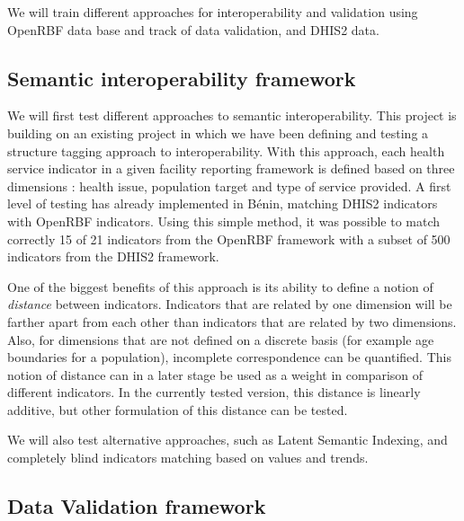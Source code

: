 We will train different approaches for interoperability and validation using OpenRBF data base and track of data validation, and DHIS2 data.

\subsection{Semantic interoperability framework}

We will first test different approaches to semantic interoperability. This project is building on an existing project in which we have been defining and testing a structure tagging approach to interoperability. With this approach, each health service indicator in a given facility reporting framework is defined based on three dimensions : health issue, population target and type of service provided. A first level of testing has already implemented in Bénin, matching DHIS2 indicators with OpenRBF indicators. Using this simple method, it was possible to match correctly 15 of 21 indicators from the OpenRBF framework with a subset of 500 indicators from the DHIS2 framework.

One of the biggest benefits of this approach is its ability to define a notion of \textit{distance} between indicators. Indicators that are related by one dimension will be farther apart from each other than indicators that are related by two dimensions. Also, for dimensions that are not defined on a discrete basis (for example age boundaries for a population), incomplete correspondence can be quantified. This notion of distance can in a later stage be used as a weight in comparison of different indicators. In the currently tested version, this distance is linearly additive, but other formulation of this distance can be tested.

We will also test alternative approaches, such as Latent Semantic Indexing, and completely blind indicators matching based on values and trends.

\subsection{Data Validation framework}

